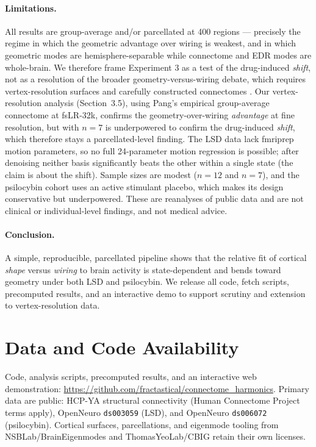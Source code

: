 \documentclass[10pt,a4paper]{article}
\begin{document}
\paragraph{Limitations.} All results are group-average and/or parcellated at 400
regions --- precisely the regime in which the geometric advantage over wiring is
weakest, and in which geometric modes are hemisphere-separable while connectome
and EDR modes are whole-brain. We therefore frame Experiment 3 as a test of the
drug-induced \emph{shift}, not as a resolution of the broader geometry-versus-wiring
debate, which requires vertex-resolution surfaces and carefully constructed
connectomes \cite{mansour2024}. Our vertex-resolution analysis (Section~3.5), using
Pang's empirical group-average connectome at fsLR-32k, confirms the geometry-over-wiring
\emph{advantage} at fine resolution, but with $n=7$ is underpowered to confirm the
drug-induced \emph{shift}, which therefore stays a parcellated-level finding.
The LSD data lack fmriprep motion parameters, so
no full 24-parameter motion regression is possible; after denoising neither basis
significantly beats the other within a single state (the claim is about the shift).
Sample sizes are modest ($n=12$ and $n=7$), and the psilocybin cohort uses an
active stimulant placebo, which makes its design conservative but underpowered.
These are reanalyses of public data and are not clinical or individual-level
findings, and not medical advice.

\paragraph{Conclusion.} A simple, reproducible, parcellated pipeline shows that
the relative fit of cortical \emph{shape} versus \emph{wiring} to brain activity
is state-dependent and bends toward geometry under both LSD and psilocybin. We
release all code, fetch scripts, precomputed results, and an interactive demo to
support scrutiny and extension to vertex-resolution data.

\section*{Data and Code Availability}
Code, analysis scripts, precomputed results, and an interactive web demonstration:
\url{https://github.com/fractastical/connectome_harmonics}. Primary data are public:
HCP-YA structural connectivity (Human Connectome Project terms apply), OpenNeuro
\texttt{ds003059} (LSD), and OpenNeuro \texttt{ds006072} (psilocybin). Cortical
surfaces, parcellations, and eigenmode tooling from NSBLab/BrainEigenmodes and
ThomasYeoLab/CBIG retain their own licenses.
\end{document}
